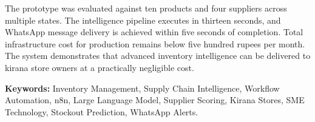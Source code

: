 The prototype was evaluated against ten products and four suppliers across multiple states. The intelligence pipeline executes in thirteen seconds, and WhatsApp message delivery is achieved within five seconds of completion. Total infrastructure cost for production remains below five hundred rupees per month. The system demonstrates that advanced inventory intelligence can be delivered to kirana store owners at a practically negligible cost.

\vspace{0.8cm}
\noindent\textbf{Keywords:} Inventory Management, Supply Chain Intelligence, Workflow Automation,
n8n, Large Language Model, Supplier Scoring, Kirana Stores, SME Technology, Stockout Prediction,
WhatsApp Alerts.

\clearpage
